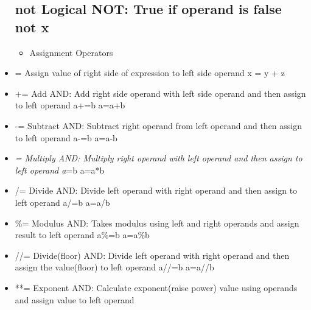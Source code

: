 \documentclass[11pt]{article}
\providecommand{\tightlist}{%
      \setlength{\itemsep}{0pt}\setlength{\parskip}{0pt}}
\begin{document}
\begin{itemize}
  \subsection{not Logical NOT: True if operand is false not
  x}\label{not-logical-not-true-if-operand-is-false-not-x}

  \begin{itemize}
  \tightlist
  \item
    Assignment Operators
  \end{itemize}
\item
  = Assign value of right side of expression to left side operand x = y
  + z
\item
  += Add AND: Add right side operand with left side operand and then
  assign to left operand a+=b a=a+b
\item
  -= Subtract AND: Subtract right operand from left operand and then
  assign to left operand a-=b a=a-b
\item
  \emph{= Multiply AND: Multiply right operand with left operand and
  then assign to left operand a}=b a=a*b
\item
  /= Divide AND: Divide left operand with right operand and then assign
  to left operand a/=b a=a/b
\item
  \%= Modulus AND: Takes modulus using left and right operands and
  assign result to left operand a\%=b a=a\%b
\item
  //= Divide(floor) AND: Divide left operand with right operand and then
  assign the value(floor) to left operand a//=b a=a//b
\item
  **= Exponent AND: Calculate exponent(raise power) value using operands
  and assign value to left operand
\end{itemize}
\end{document}
